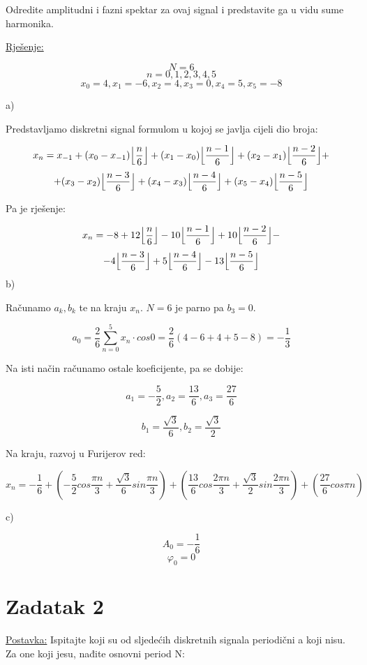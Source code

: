 \documentclass[12pt]{article}
\DeclarePairedDelimiter\floor{\lfloor}{\rfloor}
\begin{document}
Odredite amplitudni i fazni spektar za ovaj signal i predstavite ga u vidu sume harmonika.


\underline{Rješenje:}

$$N = 6$$
$$n = 0, 1, 2, 3, 4, 5$$
$$x_0 = 4, x_1 = -6, x_2 = 4, x_3 = 0, x_4 = 5, x_5 = -8$$

a)

Predstavljamo diskretni signal formulom u kojoj se javlja cijeli dio broja:

$$x_n = x_{-1} + (x_0 - x_{-1}) \floor[\Big]{\frac{n}{6}} + (x_1 - x_0) \floor[\Big]{\frac{n - 1}{6}} + (x_2 - x_1)  \floor[\Big]{\frac{n - 2}{6}} + $$
$$ + (x_3 - x_2)  \floor[\Big]{\frac{n - 3}{6}} + (x_4 - x_3)  \floor[\Big]{\frac{n - 4}{6}}  + (x_5 - x_4)  \floor[\Big]{\frac{n - 5}{6}}$$ 

Pa je rješenje:

$$x_n = -8 + 12 \floor[\Big]{\frac{n}{6}} - 10 \floor[\Big]{\frac{n - 1}{6}} + 10  \floor[\Big]{\frac{n - 2}{6}} - $$
$$ - 4\floor[\Big]{\frac{n - 3}{6}} + 5  \floor[\Big]{\frac{n - 4}{6}}  - 13 \floor[\Big]{\frac{n - 5}{6}}$$
\newpage
b) 

Računamo $a_k, b_k$ te na kraju $x_n$. $N = 6$ je parno pa $b_3 = 0$.

$$a_0 = \frac{2}{6} \sum_{n = 0}^{5} x_n \cdot cos 0 = \frac{2}{6} (4 - 6 + 4 + 5 - 8) = - \frac{1}{3}$$

Na isti način računamo ostale koeficijente, pa se dobije:

$$a_1 = - \frac{5}{2}, a_2 = \frac{13}{6}, a_3 = \frac{27}{6}$$

$$b_1 = \frac{\sqrt{3}}{6}, b_2 = \frac{\sqrt{3}}{2}$$

Na kraju, razvoj u Furijerov red:

$$x_n = - \frac{1}{6} + (- \frac{5}{2} cos \frac{\pi n}{3} + \frac{\sqrt{3}}{6} sin \frac{\pi n}{3}) + (\frac{13}{6}cos\frac{2 \pi n}{3} + \frac{\sqrt{3}}{2} sin \frac{2\pi n}{3}) + (\frac{27}{6} cos \pi n)$$
 
c)

$$A_0 = - \frac{1}{6}$$
$$\varphi_{0} = 0$$

\newpage

\section*{Zadatak 2\label{Z2}}

\underline{Postavka:}
Ispitajte koji su od sljedećih diskretnih signala periodični a koji nisu. Za one koji jesu, nađite osnovni period N:
\end{document}
